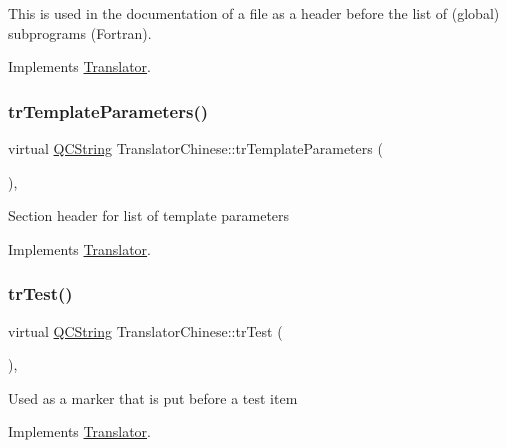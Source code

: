 This is used in the documentation of a file as a header before the list of (global) subprograms (Fortran). 

Implements \mbox{\hyperlink{class_translator}{Translator}}.

\mbox{\label{class_translator_chinese_a96ac34d4daa866df229b70296b424a6b}} 
\subsubsection{\texorpdfstring{trTemplateParameters()}{trTemplateParameters()}}
{\footnotesize\ttfamily virtual \mbox{\hyperlink{class_q_c_string}{Q\+C\+String}} Translator\+Chinese\+::tr\+Template\+Parameters (\begin{DoxyParamCaption}{ }\end{DoxyParamCaption})\hspace{0.3cm}{\ttfamily [inline]}, {\ttfamily [virtual]}}

Section header for list of template parameters 

Implements \mbox{\hyperlink{class_translator}{Translator}}.

\mbox{\label{class_translator_chinese_a65fe10edd3047d2250a200f20c049f28}} 
\subsubsection{\texorpdfstring{trTest()}{trTest()}}
{\footnotesize\ttfamily virtual \mbox{\hyperlink{class_q_c_string}{Q\+C\+String}} Translator\+Chinese\+::tr\+Test (\begin{DoxyParamCaption}{ }\end{DoxyParamCaption})\hspace{0.3cm}{\ttfamily [inline]}, {\ttfamily [virtual]}}

Used as a marker that is put before a test item 

Implements \mbox{\hyperlink{class_translator}{Translator}}.

\mbox{\label{class_translator_chinese_a9c72ee75945f11881ed0bf37b050e15f}} 
